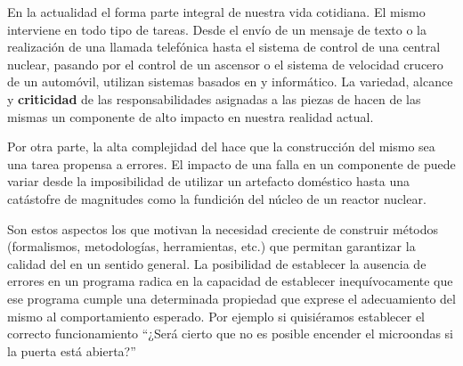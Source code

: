 En la actualidad el \soft forma parte integral de nuestra vida cotidiana. El
mismo interviene en todo tipo de tareas. Desde el envío de un mensaje de texto o
la realización de una llamada telefónica hasta el sistema de control de una
central nuclear, pasando por el control de un ascensor o el sistema de velocidad
crucero de un automóvil, utilizan sistemas basados en \hard y \soft
informático. La variedad, alcance y \textbf{criticidad} de las responsabilidades
asignadas a las piezas de \soft hacen de las mismas un componente de alto
impacto en nuestra realidad actual. 

Por otra parte, la alta complejidad del \soft hace que la construcción del mismo
sea una tarea propensa a errores. El impacto de una falla en un componente de
\soft puede variar desde la imposibilidad de utilizar un artefacto doméstico
hasta una catástofre de magnitudes como la fundición del núcleo de un reactor
nuclear. 

Son estos aspectos los que motivan la necesidad creciente de construir métodos
(formalismos, metodologías, herramientas, etc.) que permitan garantizar la
calidad del \soft en un sentido general. La posibilidad de establecer la
ausencia de errores en un programa radica en la capacidad de establecer
inequívocamente que ese programa cumple una determinada propiedad que exprese
el adecuamiento del mismo al comportamiento esperado.
Por ejemplo si quisiéramos establecer el correcto  funcionamiento ``¿Será cierto que no es
posible encender el microondas si la puerta está abierta?''